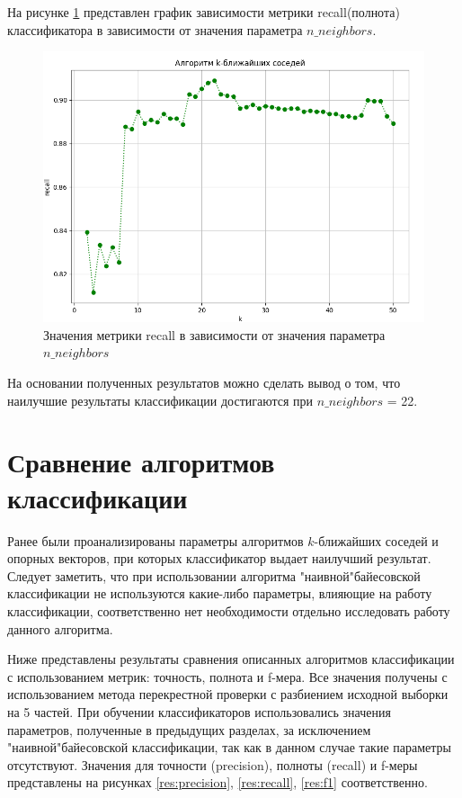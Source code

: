 На рисунке \ref{res:kn-graphs} представлен график зависимости метрики recall(полнота) классификатора в зависимости от значения параметра $n\_neighbors$.

\begin{figure}[h!]
	\centering
	\includegraphics[width=\textwidth]{inc/img/kn-graphs.png}
	\caption{Значения метрики recall в зависимости от значения параметра $n\_neighbors$}
	\label{res:kn-graphs}
\end{figure}

На основании полученных результатов можно сделать вывод о том, что наилучшие результаты классификации достигаются при $n\_neighbors$ = 22.

\section{Сравнение алгоритмов классификации}

Ранее были проанализированы параметры алгоритмов $k$-ближайших соседей и опорных векторов, при которых классификатор выдает наилучший результат. Следует заметить, что при использовании алгоритма "наивной"\space байесовской классификации не используются какие-либо параметры, влияющие на работу классификации, соответственно нет необходимости отдельно исследовать работу данного алгоритма.

Ниже представлены результаты сравнения описанных алгоритмов классификации с использованием метрик: точность, полнота и f-мера. Все значения получены с использованием метода перекрестной проверки с разбиением исходной выборки на 5 частей. При обучении классификаторов использовались значения параметров, полученные в предыдущих разделах, за исключением "наивной"\space байесовской классификации, так как в данном случае такие параметры отсутствуют. 
Значения для точности (precision), полноты (recall) и f-меры представлены на рисунках \ref{res:precision}, \ref{res:recall}, \ref{res:f1} соответственно.

